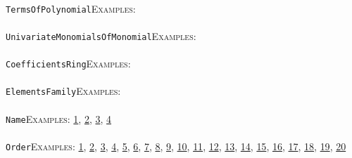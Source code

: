 \documentclass[a4paper,11pt]{report}
\begin{document}
{{ \\
 \texttt{TermsOfPolynomial}{\nobreakspace}{\nobreakspace}{\nobreakspace}{\nobreakspace}\textsc{Examples:} \\
 \\
 \texttt{UnivariateMonomialsOfMonomial}{\nobreakspace}{\nobreakspace}{\nobreakspace}{\nobreakspace}\textsc{Examples:} \\
 \\
 \texttt{CoefficientsRing}{\nobreakspace}{\nobreakspace}{\nobreakspace}{\nobreakspace}\textsc{Examples:} \\
 \\
 \texttt{ElementsFamily}{\nobreakspace}{\nobreakspace}{\nobreakspace}{\nobreakspace}\textsc{Examples:} \\
 \\
 \texttt{Name}{\nobreakspace}{\nobreakspace}{\nobreakspace}{\nobreakspace}\textsc{Examples:} \href{tutorial/chap6.html} {1}{\nobreakspace}, \href{../www/SideLinks/About/aboutAbelianCategories.html} {2}{\nobreakspace}, \href{../www/SideLinks/About/aboutGraphsOfGroups.html} {3}{\nobreakspace}, \href{../www/SideLinks/About/aboutIntro.html} {4}{\nobreakspace} \\
 \\
 \texttt{Order}{\nobreakspace}{\nobreakspace}{\nobreakspace}{\nobreakspace}\textsc{Examples:} \href{tutorial/chap3.html} {1}{\nobreakspace}, \href{tutorial/chap6.html} {2}{\nobreakspace}, \href{../www/SideLinks/About/aboutAbelianCategories.html} {3}{\nobreakspace}, \href{../www/SideLinks/About/aboutNonabelian.html} {4}{\nobreakspace}, \href{../www/SideLinks/About/aboutPeriodic.html} {5}{\nobreakspace}, \href{../www/SideLinks/About/aboutCohomologyRings.html} {6}{\nobreakspace}, \href{../www/SideLinks/About/aboutPoincareSeries.html} {7}{\nobreakspace}, \href{../www/SideLinks/About/aboutCoveringSpaces.html} {8}{\nobreakspace}, \href{../www/SideLinks/About/aboutCoverinSpaces.html} {9}{\nobreakspace}, \href{../www/SideLinks/About/aboutPolytopes.html} {10}{\nobreakspace}, \href{../www/SideLinks/About/aboutQuandles.html} {11}{\nobreakspace}, \href{../www/SideLinks/About/aboutCrossedMods.html} {12}{\nobreakspace}, \href{../www/SideLinks/About/aboutquasi.html} {13}{\nobreakspace}, \href{../www/SideLinks/About/aboutSchurMultiplier.html} {14}{\nobreakspace}, \href{../www/SideLinks/About/aboutSimplicialGroups.html} {15}{\nobreakspace}, \href{../www/SideLinks/About/aboutExtensions.html} {16}{\nobreakspace}, \href{../www/SideLinks/About/aboutSpaceGroup.html} {17}{\nobreakspace}, \href{../www/SideLinks/About/aboutSuperperfect.html} {18}{\nobreakspace}, \href{../www/SideLinks/About/aboutGouter.html} {19}{\nobreakspace}, \href{../www/SideLinks/About/aboutTensorSquare.html} {20}{\nobreakspace} \\
}}
\end{document}

